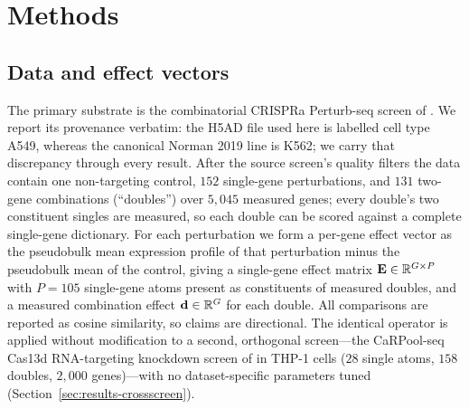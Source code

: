 \section{Methods}
\label{sec:methods}

\subsection{Data and effect vectors}
\label{sec:methods-data}
The primary substrate is the combinatorial CRISPRa Perturb-seq screen of \citet{Norman2019}.
We report its provenance verbatim: the H5AD file used here is labelled cell type A549, whereas
the canonical Norman 2019 line is K562; we carry that discrepancy through every result. After
the source screen's quality filters the data contain one non-targeting control, $152$ single-gene
perturbations, and $131$ two-gene combinations (``doubles'') over $5{,}045$ measured genes; every
double's two constituent singles are measured, so each double can be scored against a complete
single-gene dictionary. For each perturbation we form a per-gene effect vector as the pseudobulk
mean expression profile of that perturbation minus the pseudobulk mean of the control, giving a
single-gene effect matrix $\mathbf{E}\in\mathbb{R}^{G\times P}$ with $P=105$ single-gene atoms present
as constituents of measured doubles, and a measured combination effect $\mathbf{d}\in\mathbb{R}^{G}$ for
each double. All comparisons are reported as cosine similarity, so claims are directional. The
identical operator is applied without modification to a second, orthogonal screen---the CaRPool-seq
Cas13d RNA-targeting knockdown screen of \citet{Wessels2023} in THP-1 cells ($28$ single atoms,
$158$ doubles, $2{,}000$ genes)---with no dataset-specific parameters tuned
(Section~\ref{sec:results-crossscreen}).

